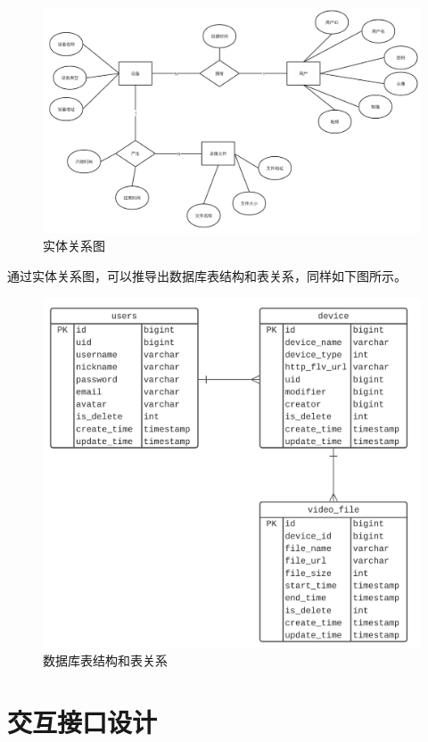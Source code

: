 \begin{figure}[ht]
    \centering
    \includegraphics[scale=.3]{./Figure/IMG_erd.png}
    \caption{实体关系图}\label{Fig:erd}
\end{figure}

通过实体关系图，可以推导出数据库表结构和表关系，同样如下图所示。

\begin{figure}[ht]
    \centering
    \includegraphics[scale=.6]{./Figure/IMG_db.png}
    \caption{数据库表结构和表关系}\label{Fig:db}
\end{figure}

\section{交互接口设计}

